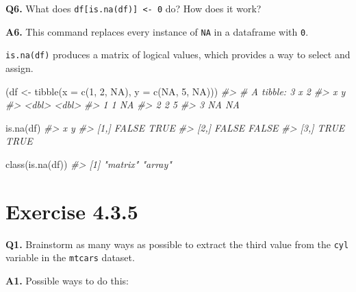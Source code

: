 \documentclass[
]{book}
\newenvironment{Shaded}{\begin{snugshade}}{\end{snugshade}}
\newcommand{\AttributeTok}[1]{\textcolor[rgb]{0.77,0.63,0.00}{#1}}
\newcommand{\CommentTok}[1]{\textcolor[rgb]{0.56,0.35,0.01}{\textit{#1}}}
\newcommand{\ConstantTok}[1]{\textcolor[rgb]{0.00,0.00,0.00}{#1}}
\newcommand{\DecValTok}[1]{\textcolor[rgb]{0.00,0.00,0.81}{#1}}
\newcommand{\FunctionTok}[1]{\textcolor[rgb]{0.00,0.00,0.00}{#1}}
\newcommand{\NormalTok}[1]{#1}
\newcommand{\OtherTok}[1]{\textcolor[rgb]{0.56,0.35,0.01}{#1}}
\begin{document}
\textbf{Q6.} What does \texttt{df{[}is.na(df){]}\ \textless{}-\ 0} do? How does it work?

\textbf{A6.} This command replaces every instance of \texttt{NA} in a dataframe with \texttt{0}.

\texttt{is.na(df)} produces a matrix of logical values, which provides a way to select and assign.

\begin{Shaded}
\begin{Highlighting}[]
\NormalTok{(df }\OtherTok{\textless{}{-}} \FunctionTok{tibble}\NormalTok{(}\AttributeTok{x =} \FunctionTok{c}\NormalTok{(}\DecValTok{1}\NormalTok{, }\DecValTok{2}\NormalTok{, }\ConstantTok{NA}\NormalTok{), }\AttributeTok{y =} \FunctionTok{c}\NormalTok{(}\ConstantTok{NA}\NormalTok{, }\DecValTok{5}\NormalTok{, }\ConstantTok{NA}\NormalTok{)))}
\CommentTok{\#\textgreater{} \# A tibble: 3 x 2}
\CommentTok{\#\textgreater{}       x     y}
\CommentTok{\#\textgreater{}   \textless{}dbl\textgreater{} \textless{}dbl\textgreater{}}
\CommentTok{\#\textgreater{} 1     1    NA}
\CommentTok{\#\textgreater{} 2     2     5}
\CommentTok{\#\textgreater{} 3    NA    NA}

\FunctionTok{is.na}\NormalTok{(df)}
\CommentTok{\#\textgreater{}          x     y}
\CommentTok{\#\textgreater{} [1,] FALSE  TRUE}
\CommentTok{\#\textgreater{} [2,] FALSE FALSE}
\CommentTok{\#\textgreater{} [3,]  TRUE  TRUE}

\FunctionTok{class}\NormalTok{(}\FunctionTok{is.na}\NormalTok{(df))}
\CommentTok{\#\textgreater{} [1] "matrix" "array"}
\end{Highlighting}
\end{Shaded}

\hypertarget{exercise-4.3.5}{%
\section{Exercise 4.3.5}\label{exercise-4.3.5}}

\textbf{Q1.} Brainstorm as many ways as possible to extract the third value from the \texttt{cyl} variable in the \texttt{mtcars} dataset.

\textbf{A1.} Possible ways to do this:
\end{document}
